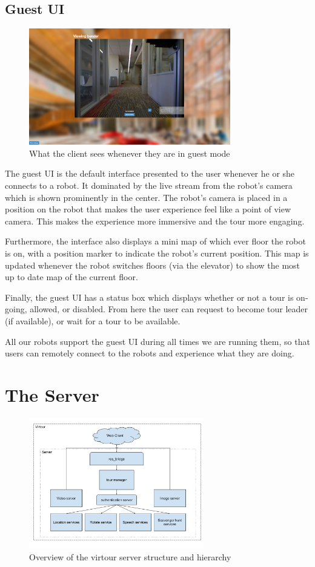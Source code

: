 \documentclass{sig-alternate-05-2015}
\begin{document}
\subsection{Guest UI}

\begin{figure}
\centering
\includegraphics[height=2in]{guestUI}
\caption{What the client sees whenever they are in guest mode}
\end{figure}

The guest UI is the default interface presented to the user whenever he or she
connects to a robot. It dominated by the live stream from the robot's camera
which is shown prominently in the center. The robot's camera is placed in a
position on the robot that makes the user experience feel like a point of view
camera. This makes the experience more immersive and the tour more engaging.

Furthermore, the interface also displays a mini map of which ever floor the
robot is on, with a position marker to indicate the robot's current position.
This map is updated whenever the robot switches floors (via the elevator) to
show the most up to date map of the current floor.

Finally, the guest UI has a status box which displays whether or not a tour is
on-going, allowed, or disabled. From here the user can request to become tour
leader (if available), or wait for a tour to be available.

All our robots support the guest UI during all times we are running them, so
that users can remotely connect to the robots and experience what they are
doing.

\section{The Server}

\begin{figure}
\centering
\includegraphics[width=3in]{virtour_server}
\caption{Overview of the virtour server structure and hierarchy}
\end{figure}
\end{document}
